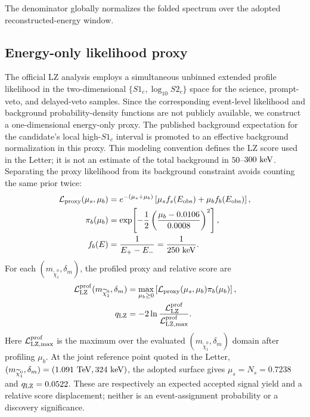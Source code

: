 \documentclass[%
  aps,
  prl,
  reprint,
  superscriptaddress,
  amsmath,
  amssymb,
  longbibliography
]{revtex4-2}
\begin{document}
{The denominator globally normalizes the folded spectrum over the adopted
reconstructed-energy window.

\subsection{Energy-only likelihood proxy}
\label{subsec:lz-likelihood-supp}

The official LZ analysis employs a simultaneous unbinned extended profile
likelihood in the two-dimensional \(\{S1_c,\log_{10}S2_c\}\) space for the
science, prompt-veto, and delayed-veto samples.  Since the corresponding
event-level likelihood and background probability-density functions are not
publicly available, we construct a one-dimensional energy-only proxy.  The
published background expectation for the candidate's local high-\(S1_c\)
interval is promoted to an effective background normalization in this proxy.
This modeling convention defines the LZ score used in the Letter; it is not
an estimate of the total background in \(50\)--\(300~{\rm keV}\).  Separating
the proxy likelihood from its background constraint avoids counting the same
prior twice:
\begin{equation}
 \begin{split}
 {\cal L}_{\rm proxy}(\mu_s,\mu_b)
 &=e^{-(\mu_s+\mu_b)}
 \left[\mu_sf_s(E_{\rm obs})+\mu_bf_b(E_{\rm obs})\right],\\
 \pi_b(\mu_b)
 &=\exp\!\left[-\frac{1}{2}
 \left(\frac{\mu_b-0.0106}{0.0008}\right)^2\right],\\
 f_b(E)&=\frac{1}{E_+-E_-}=\frac{1}{250~{\rm keV}} .
 \end{split}
 \label{eq:lz-likelihood-supp}
\end{equation}
For each \((m_{\widetilde\chi_1^0},\delta_m)\), the profiled proxy and
relative score are
\begin{equation}
 \begin{split}
 {\cal L}_{\rm LZ}^{\rm prof}
 (m_{\widetilde\chi_1^0},\delta_m)
 &=\max_{\mu_b\geq0}
 \left[{\cal L}_{\rm proxy}(\mu_s,\mu_b)\pi_b(\mu_b)\right],\\
 q_{\rm LZ}&=-2\ln
 \frac{{\cal L}_{\rm LZ}^{\rm prof}}
 {{\cal L}_{\rm LZ,max}^{\rm prof}} .
 \end{split}
 \label{eq:lz-test-statistic-supp}
\end{equation}
Here \({\cal L}_{\rm LZ,max}^{\rm prof}\) is the maximum over the evaluated
\((m_{\widetilde\chi_1^0},\delta_m)\) domain after profiling \(\mu_b\).
At the joint reference point quoted in the Letter,
\({(m_{\widetilde\chi_1^0},\delta_m)=(1.091~{\rm TeV},324~{\rm keV})}\),
the adopted surface gives \({\mu_s=N_s=0.7238}\) and
\({q_{\rm LZ}=0.0522}\).  These are respectively an expected accepted signal
yield and a relative score displacement; neither is an
event-assignment probability or a discovery significance.

}
\end{document}
